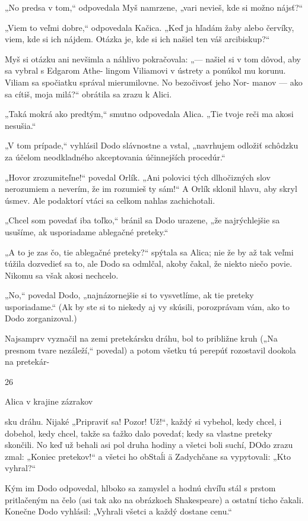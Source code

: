 \documentclass[12pt]{article}
\begin{document}
\begin{Parallel}[p]{}{}
{{„No predsa v tom,“ odpovedala Myš namrzene, „vari
nevieš, kde si možno nájsť?“

„Viem to veľmi dobre,“ odpovedala Kačica. „Keď ja
hľadám žaby alebo červíky, viem, kde si ich nájdem. Otázka
je, kde si ich našiel ten váš arcibiskup?“

Myš si otázku ani nevšimla a náhlivo pokračovala:
„— našiel si v tom dôvod, aby sa vybral s Edgarom Athe-
lingom Viliamovi v ústrety a ponúkol mu korunu. Viliam sa
spočiatku správal mierumilovne. No bezočivosť jeho Nor-
manov — ako sa cítiš, moja milá?“ obrátila sa zrazu k Alici.

„Taká mokrá ako predtým,“ smutno odpovedala Alica.
„Tie tvoje reči ma akosi nesušia.“

„V tom prípade,“ vyhlásil Dodo slávnostne a vstal,
„navrhujem odložiť schôdzku za účelom neodkladného
akceptovania účinnejších procedúr.“

„Hovor zrozumiteľne!“ povedal Orlík. „Ani polovici tých
dlhočizných slov nerozumiem a neverím, že im rozumieš ty
sám!“ A Orlík sklonil hlavu, aby skryl úsmev. Ale podaktorí
vtáci sa celkom nahlas zachichotali.

„Chcel som povedať iba toľko,“ bránil sa Dodo urazene,
„že najrýchlejšie sa usušíme, ak usporiadame ablegačné
preteky.“

„A to je zas čo, tie ablegačné preteky?“ spýtala sa Alica;
nie že by až tak veľmi túžila dozvedieť sa to, ale Dodo sa
odmlčal, akoby čakal, že niekto niečo povie. Nikomu sa
však akosi nechcelo.

„No,“ povedal Dodo, „najnázornejšie si to vysvetlíme,
ak tie preteky usporiadame.“ (Ak by ste si to niekedy aj
vy skúsili, porozprávam vám, ako to Dodo zorganizoval.)

Najsamprv vyznačil na zemi pretekársku dráhu, bol to
približne kruh („Na presnom tvare nezáleží,“ povedal)
a potom všetku tú perepúť rozostavil dookola na pretekár-

26

 

Alica v krajine zázrakov

sku dráhu. Nijaké „Pripraviť sa! Pozor! Už!“, každý si
vybehol, kedy chcel, i dobehol, kedy chcel, takže sa ťažko
dalo povedať; kedy sa vlastne preteky skončili. No keď už
behali asi pol druha hodiny a všetci boli suchí, DOdo zrazu
zmal: „Koniec pretekov!“ a všetci ho obStaĺi ä Zadychčane
sa vypytovali: „Kto vyhral?“

Kým im Dodo odpovedal, hlboko sa zamyslel a hodnú
chvíľu stál s prstom pritlačeným na čelo (asi tak ako na
obrázkoch Shakespeare) a ostatní ticho čakali. Konečne
Dodo vyhlásil: „Vyhrali všetci a každý dostane cenu.“

}}
\end{Parallel}
\end{document}
